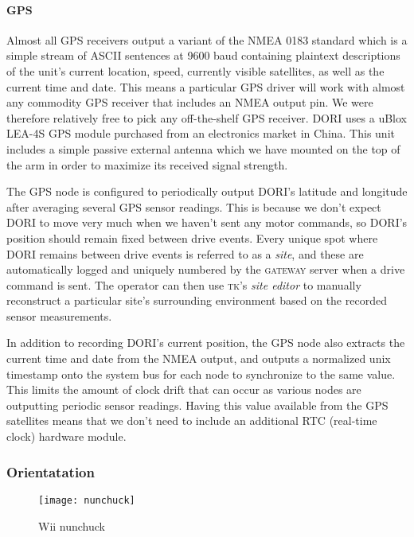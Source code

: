 \documentclass[12pt]{article}
\newcommand{\brand}{}
\begin{document}
    \paragraph*{GPS}
    Almost all GPS receivers output a variant of the NMEA 0183 standard which is a simple stream of ASCII sentences at 9600 baud containing plaintext descriptions of the unit's current location, speed, currently visible satellites, as well as the current time and date. This means a particular GPS driver will work with almost any commodity GPS receiver that includes an NMEA output pin. We were therefore relatively free to pick any off-the-shelf GPS receiver. DORI uses a \brand{uBlox LEA-4S} GPS module purchased from an electronics market in China. This unit includes a simple passive external antenna which we have mounted on the top of the arm in order to maximize its received signal strength.

    The GPS node is configured to periodically output DORI's latitude and longitude after averaging several GPS sensor readings. This is because we don't expect DORI to move very much when we haven't sent any motor commands, so DORI's position should remain fixed between drive events. Every unique spot where DORI remains between drive events is referred to as a \emph{site}, and these are automatically logged and uniquely numbered by the \textsc{gateway} server when a drive command is sent. The operator can then use \textsc{tk}'s \emph{site editor} to manually reconstruct a particular site's surrounding environment based on the recorded sensor measurements.

    In addition to recording DORI's current position, the GPS node also extracts the current time and date from the NMEA output, and outputs a normalized unix timestamp onto the system bus for each node to synchronize to the same value. This limits the amount of clock drift that can occur as various nodes are outputting periodic sensor readings. Having this value available from the GPS satellites means that we don't need to include an additional RTC (real-time clock) hardware module. 

\subsubsection{Orientatation}
    \begin{wrapfigure}{l}{0.2\textwidth}
        \centering
        \texttt{[image: nunchuck]}
        \caption*{Wii nunchuck}
    \end{wrapfigure}
\end{document}
